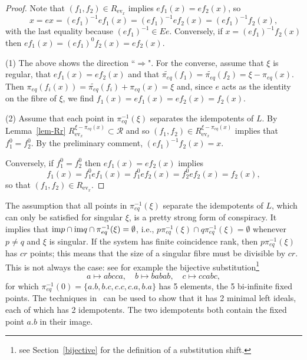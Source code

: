 \documentclass[10pt,a4paper]{amsart}
\numberwithin{equation}{section}
\newcommand{\Rr}{{\mathcal R}}
\newcommand{\pe}{\pi_{eq}}
\newcommand{\fb}[1]{\pe^{-1}(#1)}
\newcommand{\tpe}{\widetilde{\pe}}
\newcommand{\im}{\mbox{\rm im}}
\newcommand{\ev}{\mathrm{ev}}
\begin{document}
\begin{proof} 
Note that $(f_1,f_2)\in R_{\ev_{x}}$ implies $ef_1(x) = e f_2(x)$, so
\[x=ex  =(ef_1)^{-1}ef_1(x) = (ef_1)^{-1}e f_2(x) = (ef_1)^{-1} f_2(x), \]
 with the last equality because $(ef_1)^{-1}\in Ee$. Conversely,
 if $x = (ef_1)^{-1} f_2(x)$ then $ef_1(x) = (ef_1)^0 f_2(x) = ef_2(x)$.
 
(1) The above shows the direction ``$\Rightarrow$". For the converse, assume that $\xi$ is regular, that  $ef_1(x)  = ef_2(x)$ and  that $
   \tpe(f_1) = \tpe(f_2) = \xi-\pe(x)$. Then $\pe(f_i(x)) =  \tpe(f_i)      +\pe(x) = \xi$ and, since $e$ acts as the identity on the fibre of $\xi$, we find  $f_1(x) =ef_1(x) = e f_2(x)=f_2(x)$.

(2) Assume that each point in  $\fb{\xi}$ separates the idempotents of $L$. By Lemma~\ref{lem-Rr} 
$R^{\xi-\pe(x)}_{\ev_{x}}\subset \Rr$ and so $(f_1,f_2)\in R^{\xi-\pe(x)}_{\ev_{x}}$ implies that   $f_1^0=f_2^0$. By the preliminary comment, $(ef_1)^{-1}f_2(x) = x$.

Conversely, if $f_1^0=f_2^0$ then 
$ef_1(x) = e f_2(x)$ implies \[f_1(x) = f_1^0  e f_1(x) = f_1^0 e f_2(x)= f_2^0 e f_2(x)=f_2(x),\]
so that $(f_1,f_2)\in R_{\ev_{x}}$.
\end{proof}
The assumption that all points in  $\fb{\xi}$ separate the idempotents of $L$, which can only be satisfied for singular $\xi$, is a pretty strong form of conspiracy. It implies that 
$\im p \cap \im q \cap \fb{\xi} =\emptyset$, i.e., $p \fb{\xi}\cap q \fb{\xi}=\emptyset$
whenever $p\neq q$ and $\xi$ is singular. If the system has finite coincidence rank, then 
$ p \fb{\xi}$ has $cr$ points; this means that the size of a singular fibre must be divisible by $cr$. This is not always the case: see for example the  bijective substitution\footnote{see Section~\ref{bijective} for the definition of a substitution shift.}
\[ a \mapsto abcca,\quad b\mapsto babab,\quad c\mapsto ccabc,\]
 for which $\pe^{-1}(0)=\{a.b,b.c,c.c,c.a,b.a\}$ has 5 elements, the 5 bi-infinite fixed points. The techniques in~\cite{ESBS} can be used to show that it has 2 minimal left ideals, each of which has 2 idempotents. The two idempotents both contain the fixed point $a.b$ in their image. 
\end{document}
